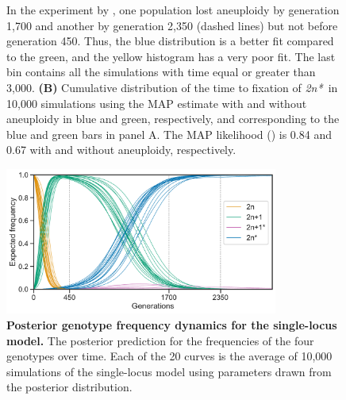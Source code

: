 \documentclass[12pt]{extarticle}
\newcommand{\eumt}{\emph{2n*}}
\begin{document}
\begin{figure}[p]
{In the experiment by \citet{Yona2012}, one population lost aneuploidy by generation 1,700 and another by generation 2,350 (dashed lines) but not before generation 450. Thus, the blue distribution is a better fit compared to the green, and the yellow histogram has a very poor fit.
The last bin contains all the simulations with time equal or greater than 3,000.
    \textbf{(B)}
	Cumulative distribution of the time to fixation of \eumt\ in 10,000 simulations using the MAP estimate with and without aneuploidy in blue and green, respectively, and corresponding to the blue and green bars in panel A. The MAP likelihood () is 0.84 and 0.67 with and without aneuploidy, respectively.
     }
  \label{fig:2n*-fixation}
\end{figure}

\begin{figure}[p]
  \centering
\includegraphics[width=0.8\textwidth]{../figures/dynamics.pdf}
  \caption{
  \textbf{Posterior genotype frequency dynamics for the single-locus model.} 
  The posterior prediction for the frequencies of the four genotypes over time. Each of the 20 curves is the average of 10,000 simulations of the single-locus model using parameters drawn from the posterior distribution.
  }
  \label{fig:ppc-plot}
\end{figure}
\end{document}
